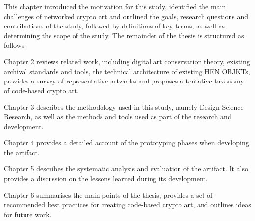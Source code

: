 This chapter introduced the motivation for this study, identified the main challenges of networked crypto art and outlined the goals, research questions and contributions of the study, followed by definitions of key terms, as well as determining the scope of the study. The remainder of the thesis is structured as follows:

Chapter 2 reviews related work, including digital art conservation theory, existing archival standards and tools, the technical architecture of existing HEN OBJKTs, provides a survey of representative artworks and proposes a tentative taxonomy of code-based crypto art.

Chapter 3 describes the methodology used in this study, namely Design Science Research, as well as the methods and tools used as part of the research and development.

Chapter 4 provides a detailed account of the prototyping phases when developing the artifact.

Chapter 5 describes the systematic analysis and evaluation of the artifact. It also provides a discussion on the lessons learned during its development.

Chapter 6 summarises the main points of the thesis, provides a set of recommended best practices for creating code-based crypto art, and outlines ideas for future work.
